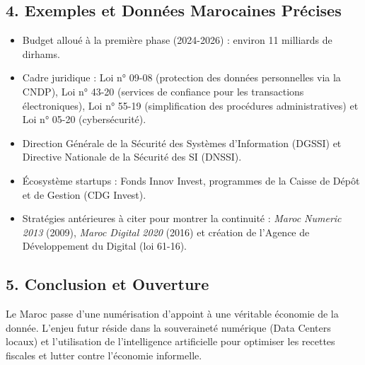 \subsection*{4. Exemples et Données Marocaines Précises}
\begin{itemize}
    \item Budget alloué à la première phase (2024-2026) : environ 11 milliards de dirhams.
    \item Cadre juridique : Loi n° 09-08 (protection des données personnelles via la CNDP), Loi n° 43-20 (services de confiance pour les transactions électroniques), Loi n° 55-19 (simplification des procédures administratives) et Loi n° 05-20 (cybersécurité).
    \item Direction Générale de la Sécurité des Systèmes d'Information (DGSSI) et Directive Nationale de la Sécurité des SI (DNSSI).
    \item Écosystème startups : Fonds Innov Invest, programmes de la Caisse de Dépôt et de Gestion (CDG Invest).
    \item Stratégies antérieures à citer pour montrer la continuité : \textit{Maroc Numeric 2013} (2009), \textit{Maroc Digital 2020} (2016) et création de l'Agence de Développement du Digital (loi 61-16).
\end{itemize}

\subsection*{5. Conclusion et Ouverture}
Le Maroc passe d'une numérisation d'appoint à une véritable économie de la donnée. L'enjeu futur réside dans la souveraineté numérique (Data Centers locaux) et l'utilisation de l'intelligence artificielle pour optimiser les recettes fiscales et lutter contre l'économie informelle.

